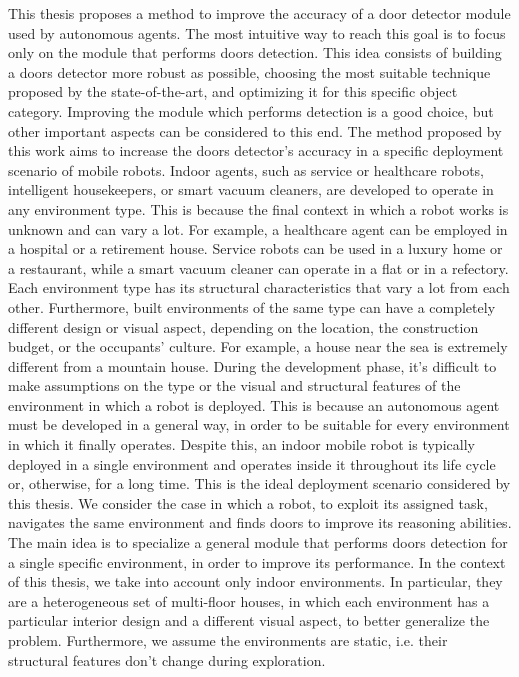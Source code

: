 This thesis proposes a method to improve the accuracy of a door detector module used by autonomous agents. The most intuitive way to reach this goal is to focus only on the module that performs doors detection. This idea consists of building a doors detector more robust as possible, choosing the most suitable technique proposed by the state-of-the-art, and optimizing it for this specific object category. Improving the module which performs detection is a good choice, but other important aspects can be considered to this end. The method proposed by this work aims to increase the doors detector's accuracy in a specific deployment scenario of mobile robots. Indoor agents, such as service or healthcare robots, intelligent housekeepers, or smart vacuum cleaners, are developed to operate in any environment type. This is because the final context in which a robot works is unknown and can vary a lot. For example, a healthcare agent can be employed in a hospital or a retirement house. Service robots can be used in a luxury home or a restaurant, while a smart vacuum cleaner can operate in a flat or in a refectory. Each environment type has its structural characteristics that vary a lot from each other. Furthermore, built environments of the same type can have a completely different design or visual aspect, depending on the location, the construction budget, or the occupants' culture. For example, a house near the sea is extremely different from a mountain house. During the development phase, it's difficult to make assumptions on the type or the visual and structural features of the environment in which a robot is deployed. This is because an autonomous agent must be developed in a general way, in order to be suitable for every environment in which it finally operates. Despite this, an indoor mobile robot is typically deployed in a single environment and operates inside it throughout its life cycle or, otherwise, for a long time. This is the ideal deployment scenario considered by this thesis. We consider the case in which a robot, to exploit its assigned task, navigates the same environment and finds doors to improve its reasoning abilities. The main idea is to specialize a general module that performs doors detection for a single specific environment, in order to improve its performance. In the context of this thesis, we take into account only indoor environments. In particular, they are a heterogeneous set of multi-floor houses, in which each environment has a particular interior design and a different visual aspect, to better generalize the problem. Furthermore, we assume the environments are static, i.e. their structural features don't change during exploration.

